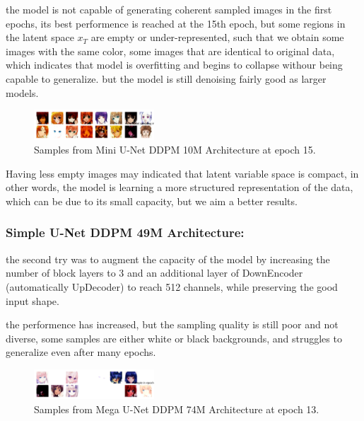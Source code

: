 \documentclass[twocolumn,superscriptaddress,aps]{revtex4-1}
\begin{document}
the model is not capable of generating coherent sampled images in the first epochs, its best performence is reached at the 15th epoch, but some regions in the latent space $x_T$ are empty or under-represented, such that we obtain some images with the same color, some images that are identical to original data, which indicates that model is overfitting and begins to collapse withour being capable to generalize. but the model is still denoising fairly good as larger models.
\begin{figure}[H]
    \centering
    \includegraphics[width=0.4\textwidth]{figures/mini_unet_ddpm_10M_ckpt_epoch_15_epoch_15_samples.png}
    \caption{Samples from Mini U-Net DDPM 10M Architecture at epoch 15.}
    \label{fig:mini_unet_ddpm_10M_ckpt_epoch_15_epoch_15_samples}
\end{figure}
Having less empty images may indicated that latent variable space is compact, in other words, the model is learning a more structured representation of the data, which can be due to its small capacity, but we aim a better results.

\subsubsection{Simple U-Net DDPM 49M Architecture:}
the second try was to augment the capacity of the model by increasing the number of block layers to 3 and an additional layer of DownEncoder (automatically UpDecoder) to reach 512 channels, while preserving the good input shape.

the performence has increased, but the sampling quality is still poor and not diverse, some samples are either white or black backgrounds, and struggles to generalize even after many epochs. 
\begin{figure}[H]
    \centering
    \includegraphics[width=0.4\textwidth]{figures/simple_unet_ddpm_49M_ckpt_epoch_13_2025-08-14_12-52-58_epoch_13_samples.png}
    \caption{Samples from Mega U-Net DDPM 74M Architecture at epoch 13.}
    \label{fig:mega_unet_ddpm_74M_ckpt_epoch_13_epoch_13_samples}
\end{figure}
\end{document}
